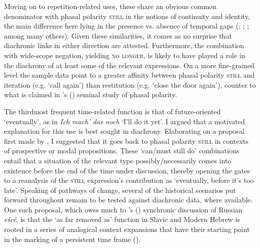 Moving on to repetition-related uses, these share an obvious common denominator with phasal polarity \textsc{still} in the notions of continuity and identity, the main difference here lying in the presence vs. absence of temporal gaps (\cite[108–109]{vanBaar1997}; \cite{SchultzeBerndt2002}; \cite{TovenaDonazzan2008}; among many others). Given these similarities, it comes as no surprise that diachronic links in either direction are attested. Furthermore, the combination with wide-scope negation, yielding \textsc{no longer}, is likely to have played a role in the diachrony of at least some of the relevant expressions. On a more fine-grained level the sample data point to a greater affinity between phasal polarity \textsc{still} and iteration (e.g. \lq call again\rq{}) than restitution (e.g. \lq close the door again\rq{}), counter to what is claimed in \citeauthor{vanBaar1997}'s (\citeyear[108–109]{vanBaar1997}) seminal study of phasal polarity.

The thirdmost frequent time-related function is that of future-oriented \lq eventually\rq{}, as in  \textit{Ich mach' das noch} \lq I'll do it yet\rq{}. I argued that a motivated explanation for this use is best sought in diachrony. Elaborating on a proposal first made by \textcite{Abraham1977}, I suggested that it goes back to phasal polarity \textsc{still} in contexts of prospective or modal propositions. These \lq can/must still do\rq{ }combinations entail that a situation of the relevant type possibly/necessarily comes into existence before the end of the time under discussion, thereby opening the gates to a reanalysis of the \textsc{still} expression's contribution as \lq eventually, before it's too late\rq{}. Speaking of pathways of change, several of the historical scenarios put forward throughout  remain to be tested against diachronic data, where available. One such proposal, which owes much to \citeauthor{Mustajoki1988}'s (\citeyear{Mustajoki1988}) synchronic discussion of Russian \textit{ešcë}, is that the \lq as far removed as\rq{ }function in Slavic and Modern Hebrew is rooted in a series of analogical context expansions that have their starting point in the marking of a persistent time frame ().

